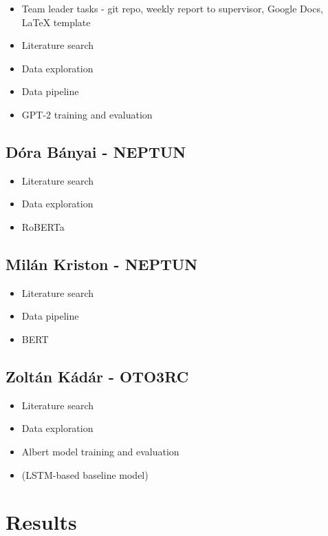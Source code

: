 \documentclass[runningheads]{llncs}
\begin{document}
\begin{itemize}
  \item Team leader tasks - git repo, weekly report to supervisor, Google Docs, LaTeX template
  \item Literature search
  \item Data exploration
  \item Data pipeline
  \item GPT-2 training and evaluation
\end{itemize}

\subsection{Dóra Bányai - NEPTUN}

\begin{itemize}
  \item Literature search
  \item Data exploration
  \item RoBERTa
\end{itemize}

\subsection{Milán Kriston - NEPTUN}

\begin{itemize}
  \item Literature search
  \item Data pipeline
  \item BERT
\end{itemize}

\subsection{Zoltán Kádár - OTO3RC}

\begin{itemize}
  \item Literature search
  \item Data exploration
  \item Albert model training and evaluation
  \item (LSTM-based baseline model)
\end{itemize}

\section{Results}
\end{document}

